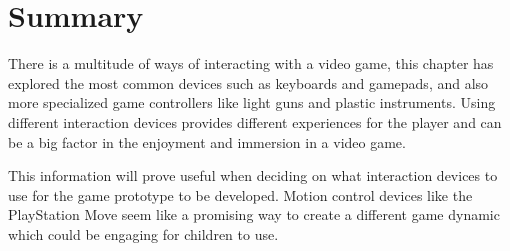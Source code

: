 \section{Summary}
There is a multitude of ways of interacting with a video game, this chapter has explored the most common devices such as keyboards and gamepads, and also more specialized game controllers like light guns and plastic instruments. Using different interaction devices provides different experiences for the player and can be a big factor in the enjoyment and immersion in a video game. 

This information will prove useful when deciding on what interaction devices to use for the game prototype to be developed. Motion control devices like the PlayStation Move seem like a promising way to create a different game dynamic which could be engaging for children to use.

